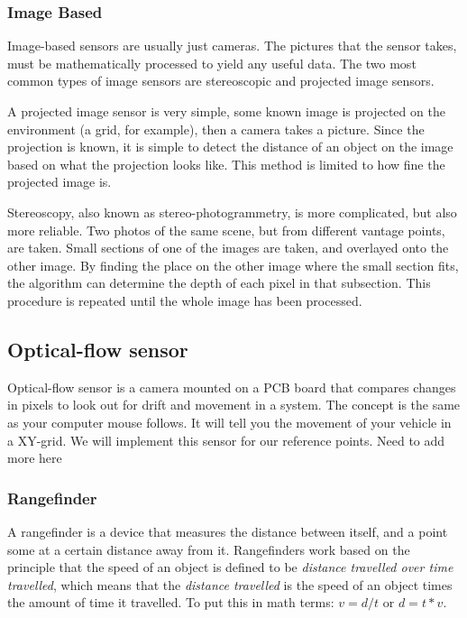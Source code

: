 \subsubsection{Image Based}
Image-based sensors are usually just cameras. %
 The pictures that the sensor takes, must be mathematically processed to yield any useful data. The two most common types of image sensors are stereoscopic and projected image sensors.

A projected image sensor is very simple, %
 some known image is projected on the environment (a grid, for example), then a camera takes a picture. Since the projection is known, it is simple to detect the distance of an object on the image based on what the projection looks like. This method is limited to how fine the projected image is. %

Stereoscopy, also known as stereo-photogrammetry, is more complicated, but also more reliable. Two photos of the same scene, but from different vantage points, are taken. Small sections of one of the images are taken, and overlayed onto the other image. By finding the place on the other image where the small section fits, the algorithm can determine the depth of each pixel in that subsection. This procedure is repeated until the whole image has been processed.

\subsection{Optical-flow sensor}
Optical-flow sensor is a camera mounted on a PCB board that compares changes in pixels to look out for drift and movement in a system. The concept is the same as your computer mouse follows. It will tell you the movement of your vehicle in a XY-grid. We will implement this sensor for our reference points. Need to add more here

\subsubsection{Rangefinder}%
A rangefinder is a device that measures the distance between itself, and a point some at a certain distance away from it. Rangefinders work based on the principle that the speed of an object is defined to be \textit{distance travelled over time travelled}, which means that the \textit{distance travelled} is the speed of an object times the amount of time it travelled. To put this in math terms: \(v=d/t\) or \(d=t*v\).

